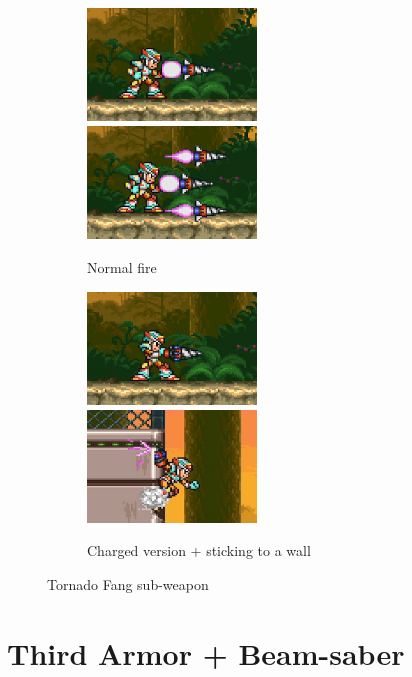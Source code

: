\begin{figure}[htp]
	\centering
	\begin{subfigure}{\linewidth}
		\centering
		\includegraphics[height=3cm]{figures/X3/weapons/T_fang.png}
		\includegraphics[height=3cm]{figures/X3/weapons/T_fang_1.png}
		\caption{Normal fire }	
	\end{subfigure}
	\begin{subfigure}{\linewidth}
		\centering
		\includegraphics[height=3cm]{figures/X3/weapons/T_fang_C.png}
		\includegraphics[height=3cm]{figures/X3/weapons/T_fang_C_1.png}
		\caption{Charged version + sticking to a wall}	
	\end{subfigure}
	\caption{Tornado Fang sub-weapon}
\end{figure}

\section{Third Armor + Beam-saber}\label{X3:Armor}

